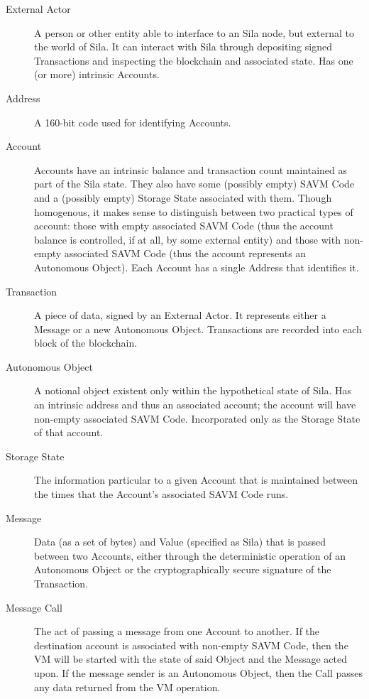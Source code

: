 \documentclass[9pt,oneside]{amsart}
\begin{document}
\begin{description}
\item[External Actor] A person or other entity able to interface to an Sila node, but external to the world of Sila. It can interact with Sila through depositing signed Transactions and inspecting the blockchain and associated state. Has one (or more) intrinsic Accounts.

\item[Address] A 160-bit code used for identifying Accounts.

\item[Account] Accounts have an intrinsic balance and transaction count maintained as part of the Sila state. They also have some (possibly empty) SAVM Code and a (possibly empty) Storage State associated with them. Though homogenous, it makes sense to distinguish between two practical types of account: those with empty associated SAVM Code (thus the account balance is controlled, if at all, by some external entity) and those with non-empty associated SAVM Code (thus the account represents an Autonomous Object). Each Account has a single Address that identifies it.

\item[Transaction] A piece of data, signed by an External Actor. It represents either a Message or a new Autonomous Object. Transactions are recorded into each block of the blockchain.

\item[Autonomous Object] A notional object existent only within the hypothetical state of Sila. Has an intrinsic address and thus an associated account; the account will have non-empty associated SAVM Code. Incorporated only as the Storage State of that account.

\item[Storage State] The information particular to a given Account that is maintained between the times that the Account's associated SAVM Code runs.

\item[Message] Data (as a set of bytes) and Value (specified as Sila) that is passed between two Accounts, either through the deterministic operation of an Autonomous Object or the cryptographically secure signature of the Transaction.

\item[Message Call] The act of passing a message from one Account to another. If the destination account is associated with non-empty SAVM Code, then the VM will be started with the state of said Object and the Message acted upon. If the message sender is an Autonomous Object, then the Call passes any data returned from the VM operation.


\end{description}
\end{document}
